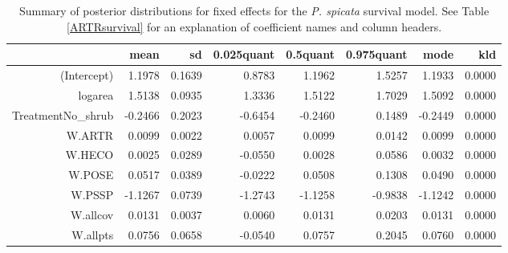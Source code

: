 \documentclass[11pt]{article}
\begin{document}
\begin{table}[ht]
\centering
\caption{Summary of posterior distributions for fixed effects for the \textit{P. spicata} survival model. See Table \ref{ARTRsurvival} for an explanation of coefficient names
and column headers.} 
\label{PSSPsurvival}
\begin{tabular}{rrrrrrrr}
  \hline
 & mean & sd & 0.025quant & 0.5quant & 0.975quant & mode & kld \\ 
  \hline
(Intercept) & 1.1978 & 0.1639 & 0.8783 & 1.1962 & 1.5257 & 1.1933 & 0.0000 \\ 
  logarea & 1.5138 & 0.0935 & 1.3336 & 1.5122 & 1.7029 & 1.5092 & 0.0000 \\ 
  TreatmentNo\_shrub & -0.2466 & 0.2023 & -0.6454 & -0.2460 & 0.1489 & -0.2449 & 0.0000 \\ 
  W.ARTR & 0.0099 & 0.0022 & 0.0057 & 0.0099 & 0.0142 & 0.0099 & 0.0000 \\ 
  W.HECO & 0.0025 & 0.0289 & -0.0550 & 0.0028 & 0.0586 & 0.0032 & 0.0000 \\ 
  W.POSE & 0.0517 & 0.0389 & -0.0222 & 0.0508 & 0.1308 & 0.0490 & 0.0000 \\ 
  W.PSSP & -1.1267 & 0.0739 & -1.2743 & -1.1258 & -0.9838 & -1.1242 & 0.0000 \\ 
  W.allcov & 0.0131 & 0.0037 & 0.0060 & 0.0131 & 0.0203 & 0.0131 & 0.0000 \\ 
  W.allpts & 0.0756 & 0.0658 & -0.0540 & 0.0757 & 0.2045 & 0.0760 & 0.0000 \\ 
   \hline
\end{tabular}
\end{table}
\end{document}

